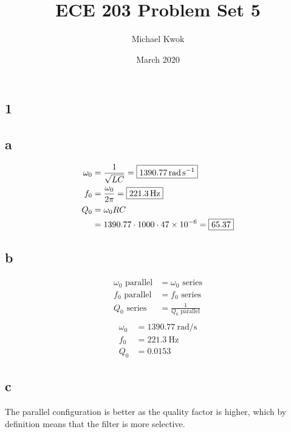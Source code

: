 \documentclass{article}
\title{ECE 203 Problem Set 5}
\author{Michael Kwok}
\date{March 2020}
\begin{document}
\maketitle
\begin{multicols}{2}
    \section*{1}
    \subsection*{a}

    \begin{align*}
        \omega_0 & = \frac{1}{\sqrt{L C}} = \boxed{\SI{1390.77}{\radian\per\second}} \\
        f_0      & = \frac{\omega_0}{2\pi} = \boxed{\SI{221.3}{\hertz}}              \\
        Q_0      & = \omega_0 R C                                                    \\
                 & = 1390.77 \cdot 1000 \cdot \num{47d-6} = \boxed{65.37}
    \end{align*}

    \subsection*{b}

    \begin{align*}
        \omega_0 \text{ parallel} & = \omega_0 \text{ series}        \\
        f_0 \text{ parallel}      & = f_0 \text{ series}             \\
        Q_0 \text{ series}        & = \frac{1}{Q_0 \text{ parallel}} \\
    \end{align*}
    \begin{align*}
        \omega_0 & = \boxed{\SI{1390.77}{\radian\per\second}} \\
        f_0      & = \boxed{\SI{221.3}{\hertz}}               \\
        Q_0      & = \boxed{0.0153}
    \end{align*}

    \subsection*{c}

    The parallel configuration is better as the quality factor is higher, which by definition means that the filter is more selective.


\end{multicols}
\end{document}
